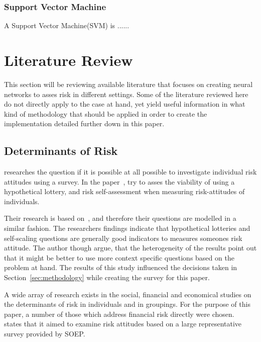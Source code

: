 \documentclass[12pt]{article}
\begin{document}
\subsubsection{Support Vector Machine}
\label{subsub:svm}

A Support Vector Machine(SVM) is ...... 

\section{Literature Review}
\label{sec:literature_review}

This section will be reviewing available literature that focuses on creating neural networks to asses risk in different settings. Some of the literature reviewed here do not directly apply to the case at hand, yet yield useful information in what kind of methodology that should be applied in order to create the implementation detailed further down in this paper.

\subsection{Determinants of Risk}
\label{sub:determinants_riks}
\cite{dp4807.pdf} researches the question if it is possible at all possible to investigate individual risk attitudes using a survey. In the paper~\cite{dp4807.pdf}, try to asses the viability of using a hypothetical lottery, and risk self-assessment when measuring risk-attitudes of individuals. 

Their research is based on~\cite{individualRiskAttitudes}, and therefore their questions are modelled in a similar fashion. The researchers findings indicate that hypothetical lotteries and self-scaling questions are generally good indicators to measures someones risk attitude. The author though argue, that the heterogeneity of the results point out that it might be better to use more context specific questions based on the problem at hand. The results of this study influenced the decisions taken in Section~\ref{sec:methodology} while creating the survey for this paper.

A wide array of research exists in the social, financial and economical studies on the determinants of risk in individuals and in groupings. For the purpose of this paper, a number of those which address financial risk directly were chosen.~\cite{individualRiskAttitudes} states that it aimed to examine risk attitudes based on a large representative survey provided by SOEP\@. 
\end{document}
